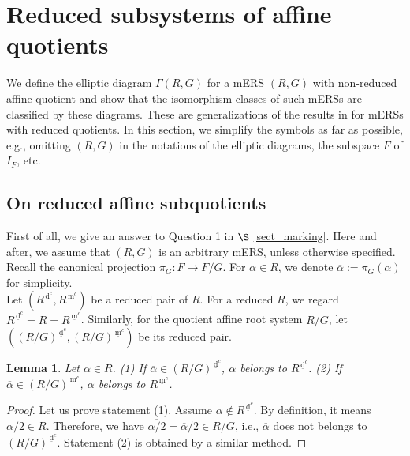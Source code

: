 \documentclass[11pt]{amsart}
\newcommand{\dc}{\,\underline{\mathrm{d}}^c}
\newcommand{\mc}{\, \underline{\mathrm{m}}^c}
\newtheorem{lemma}[thm]{Lemma}%
\begin{document}
{%


\section[Reduced subsystems of affine quotients]{Reduced subsystems of affine quotients}
\label{sect:elliptic-diagram}

We define the elliptic diagram $\Gamma(R,G)$ for a mERS 
$(R,G)$ with non-reduced affine quotient and show that the isomorphism classes of 
such mERSs are classified by these diagrams. These are generalizations of 
the results in \cite{Saito1985} for mERSs with reduced quotients. 
In this section, we simplify the symbols as far as possible, e.g., omitting $(R,G)$ in the notations of the elliptic diagrams, the subspace $F$ of $I_F$, etc. 
 
\subsection{On reduced affine subquotients}\label{sect:ans-Q1} 
First of all, we give an answer to
Question 1 in $\S$ \ref{sect_marking}. 
Here and after, we assume that $(R,G)$ is an arbitrary mERS, unless 
otherwise specified. Recall the canonical projection $\pi_G:F\to F/G$. 
For $\alpha\in R$, we denote 
$\overline{\alpha}:=\pi_G(\alpha)$ for simplicity. 
\\

Let $(R^{\dc},R^{\mc})$ be a reduced pair of $R$.
For a reduced $R$, we regard $R^{\dc}=R=R^{\mc}$. 
Similarly, for the quotient affine root system $R/G$, let 
$((R/G)^{\dc},(R/G)^{\mc})$ be its reduced pair.

\begin{lemma}\label{lemma:reduced_pair1}
Let $\alpha\in R$.
\vskip 1mm
\noindent
{\rm (1)} If $\overline{\alpha}\in (R/G)^{\dc}$, $\alpha$ belongs to $R^{\dc}$.
\vskip 1mm
\noindent
{\rm (2)} If $\overline{\alpha}\in (R/G)^{\mc}$, $\alpha$ belongs to $R^{\mc}$.
\end{lemma}
\begin{proof}
Let us prove statement (1). Assume $\alpha\not\in R^{\dc}$. 
By definition, it means 
$\alpha/2 \in R$.  Therefore, we have 
$\overline{\alpha/2}=\overline{\alpha}/2 \in R/G$, i.e., 
$\overline{\alpha}$ does not belongs to $(R/G)^{\dc}$. 
 Statement (2) is obtained by a similar method.   
\end{proof}

}
\end{document}
